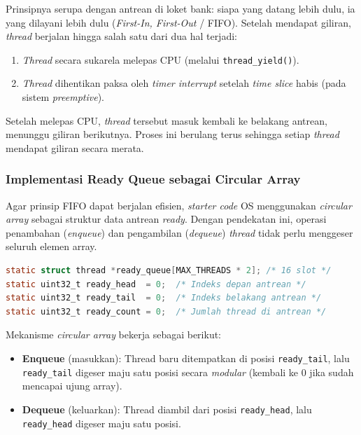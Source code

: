 Prinsipnya serupa dengan antrean di loket bank: siapa yang datang lebih dulu, ia yang dilayani lebih dulu (\textit{First-In, First-Out} / FIFO). Setelah mendapat giliran, \textit{thread} berjalan hingga salah satu dari dua hal terjadi:
\begin{enumerate}
	\item \textit{Thread} secara sukarela melepas CPU (melalui \texttt{thread\_yield()}).
	\item \textit{Thread} dihentikan paksa oleh \textit{timer interrupt} setelah \textit{time slice} habis (pada sistem \textit{preemptive}).
\end{enumerate}

Setelah melepas CPU, \textit{thread} tersebut masuk kembali ke belakang antrean, menunggu giliran berikutnya. Proses ini berulang terus sehingga setiap \textit{thread} mendapat giliran secara merata.

\subsubsection{Implementasi Ready Queue sebagai Circular Array}
Agar prinsip FIFO dapat berjalan efisien, \textit{starter code} OS menggunakan \textit{circular array} sebagai struktur data antrean \textit{ready}. Dengan pendekatan ini, operasi penambahan (\textit{enqueue}) dan pengambilan (\textit{dequeue}) \textit{thread} tidak perlu menggeser seluruh elemen array.

\begin{lstlisting}[language=C, caption={Variabel antrean thread pada thread.c}]
static struct thread *ready_queue[MAX_THREADS * 2]; /* 16 slot */
static uint32_t ready_head  = 0;  /* Indeks depan antrean */
static uint32_t ready_tail  = 0;  /* Indeks belakang antrean */
static uint32_t ready_count = 0;  /* Jumlah thread di antrean */
\end{lstlisting}

Mekanisme \textit{circular array} bekerja sebagai berikut:
\begin{itemize}
	\item \textbf{Enqueue} (masukkan): Thread baru ditempatkan di posisi \texttt{ready\_tail}, lalu \texttt{ready\_tail} digeser maju satu posisi secara \textit{modular} (kembali ke 0 jika sudah mencapai ujung array).
	\item \textbf{Dequeue} (keluarkan): Thread diambil dari posisi \texttt{ready\_head}, lalu \texttt{ready\_head} digeser maju satu posisi.
\end{itemize}

